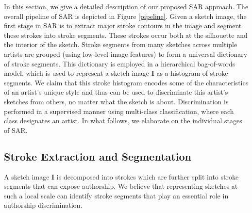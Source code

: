 In this section, we give a detailed description of our proposed SAR approach. The overall pipeline of SAR is depicted in Figure \ref{pipeline}. Given a sketch image, the first stage in SAR is to extract major stroke contours in the image and segment these strokes into stroke segments. These strokes occur both at the silhouette and the interior of the sketch. Stroke segments from many sketches across multiple artists are grouped (using low-level image features) to form a universal dictionary of stroke segments. This dictionary is employed in a hierarchical bag-of-words model, which is used to represent a sketch image $\mathbf{I}$ as a histogram of stroke segments. We claim that this stroke histogram encodes some of the characteristics of an artist's unique style and thus can be used to discriminate this artist's sketches from others, no matter what the sketch is about. Discrimination is performed in a supervised manner using multi-class classification, where each class designates an artist. In what follows, we elaborate on the individual stages of SAR.

\vspace{-2mm}
\subsection{Stroke Extraction and Segmentation}\label{subsec: segmentation}
\vspace{-2mm}

A sketch image $\mathbf{I}$ is decomposed into strokes which are further split into stroke segments that can expose authorship. We believe that representing sketches at such a local scale can identify stroke segments that play an essential role in authorship discrimination.


